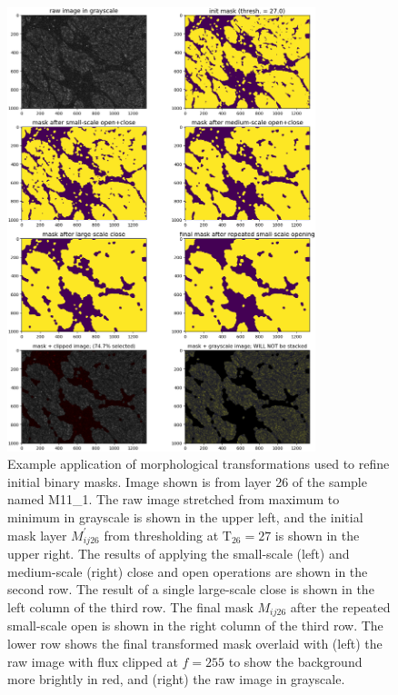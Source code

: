 \documentclass[letterpaper,11pt]{article}
\newcommand{\Tau}{\mathrm{T}}
\begin{document}
\begin{figure}[!ht]
\centering
\includegraphics[width=0.8\textwidth]{images/masking/image_218_layer_26_masks}
\caption{\footnotesize Example application of morphological transformations used to refine initial binary masks. Image shown is from layer 26 of the sample named M11\_1. The raw image stretched from maximum to minimum in grayscale is shown in the upper left, and the initial mask layer $M^{\prime}_{ij26}$ from thresholding at $\Tau_{26}=27$ is shown in the upper right. The results of applying the small-scale (left) and medium-scale (right) close and open operations are shown in the second row. The result of a single large-scale close is shown in the left column of the third row. The final mask $M_{ij26}$ after the repeated small-scale open is shown in the right column of the third row. The lower row shows the final transformed mask overlaid with (left) the raw image with flux clipped at $f=255$ to show the background more brightly in red, and (right) the raw image in grayscale.}
\label{fig:mask_example_min}
\end{figure}
\end{document}
